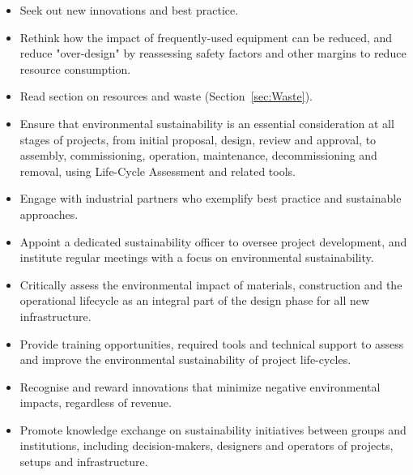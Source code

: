 \documentclass[../SustainableHEP.tex]{subfiles}
\begin{document}
\clearpage
\begin{reco2}{\currentname}
{
\begin{itemize}[leftmargin=6 mm]
\item Seek out new innovations and best practice.

\item Rethink how the impact of frequently-used equipment can be reduced, and reduce "over-design" by reassessing safety factors and other margins to reduce resource consumption.

\item Read section on resources and waste (Section~\ref{sec:Waste}).

\end{itemize}
}
{
\begin{itemize}[leftmargin=6 mm]

\item  Ensure that environmental sustainability is an essential consideration at all stages of projects, from initial proposal, design, review and approval, to assembly, commissioning, operation, maintenance, decommissioning and removal, using Life-Cycle Assessment and related tools.

\item Engage with industrial partners who exemplify best practice and sustainable approaches.

\item Appoint a dedicated sustainability officer to oversee project development, and institute regular meetings with a focus on environmental sustainability.

\end{itemize}
}
{
\begin{itemize}[leftmargin=6 mm]

\item Critically assess the environmental impact of materials, construction and the operational lifecycle as an integral part of the design phase for all new infrastructure.

\item Provide training opportunities, required tools and technical support to assess and improve the environmental sustainability of project life-cycles.

\item Recognise and reward innovations that minimize negative environmental impacts, regardless of revenue.

\item Promote knowledge exchange on sustainability initiatives between groups and institutions, including decision-makers, designers and operators of projects, setups and infrastructure.
\end{itemize}
}

\end{reco2}
\end{document}
